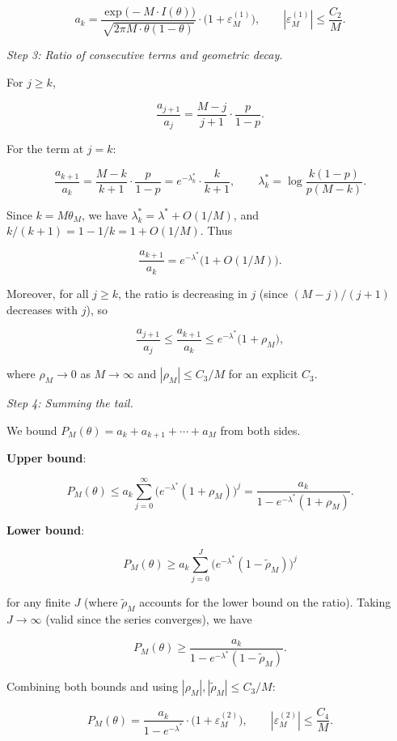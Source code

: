 \documentclass[
  12pt,
]{article}
\begin{document}
\[
a_k = \frac{\exp\!\big(-M\cdot I(\theta)\big)}{\sqrt{2\pi M\cdot\theta(1-\theta)}}
\cdot \big(1 + \varepsilon_M^{(1)}\big), \qquad |\varepsilon_M^{(1)}| \leq \frac{C_2}{M}. \tag{A.1}
\]

\emph{Step 3: Ratio of consecutive terms and geometric decay.}

For \(j \geq k\),

\[\frac{a_{j+1}}{a_j} = \frac{M-j}{j+1}\cdot\frac{p}{1-p}.\]

For the term at \(j = k\):

\[\frac{a_{k+1}}{a_k} = \frac{M-k}{k+1}\cdot\frac{p}{1-p}
= e^{-\lambda_k^*}\cdot\frac{k}{k+1}, \qquad
\lambda_k^* = \log\frac{k(1-p)}{p(M-k)}.\]

Since \(k = M\theta_M\), we have \(\lambda_k^* = \lambda^* + O(1/M)\),
and \(k/(k+1) = 1 - 1/k = 1 + O(1/M)\). Thus

\[\frac{a_{k+1}}{a_k} = e^{-\lambda^*}\big(1 + O(1/M)\big).\]

Moreover, for all \(j \geq k\), the ratio is decreasing in \(j\) (since
\((M-j)/(j+1)\) decreases with \(j\)), so

\[\frac{a_{j+1}}{a_j} \leq \frac{a_{k+1}}{a_k} \leq e^{-\lambda^*}\big(1 + \rho_M\big),\]

where \(\rho_M \to 0\) as \(M \to \infty\) and \(|\rho_M| \leq C_3/M\)
for an explicit \(C_3\).

\emph{Step 4: Summing the tail.}

We bound \(P_M(\theta) = a_k + a_{k+1} + \cdots + a_M\) from both sides.

\textbf{Upper bound}:

\[
P_M(\theta) \leq a_k \sum_{j=0}^\infty \big(e^{-\lambda^*}(1+\rho_M)\big)^j
= \frac{a_k}{1 - e^{-\lambda^*}(1+\rho_M)}.
\]

\textbf{Lower bound}:

\[
P_M(\theta) \geq a_k \sum_{j=0}^{J} \big(e^{-\lambda^*}(1-\tilde\rho_M)\big)^j
\]

for any finite \(J\) (where \(\tilde\rho_M\) accounts for the lower
bound on the ratio). Taking \(J \to \infty\) (valid since the series
converges), we have

\[
P_M(\theta) \geq \frac{a_k}{1 - e^{-\lambda^*}(1-\tilde\rho_M)}.
\]

Combining both bounds and using \(|\rho_M|, |\tilde\rho_M| \leq C_3/M\):

\[
P_M(\theta) = \frac{a_k}{1 - e^{-\lambda^*}} \cdot \big(1 + \varepsilon_M^{(2)}\big),
\qquad |\varepsilon_M^{(2)}| \leq \frac{C_4}{M}. \tag{A.2}
\]
\end{document}
